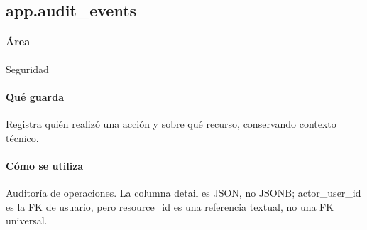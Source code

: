 \subsection{app.audit\_\allowbreak{}events}
\paragraph{Área} Seguridad

\paragraph{Qué guarda} Registra quién realizó una acción y sobre qué recurso, conservando contexto técnico.

\paragraph{Cómo se utiliza} Auditoría de operaciones. La columna detail es JSON, no JSONB; actor\_\allowbreak{}user\_\allowbreak{}id es la FK de usuario, pero resource\_\allowbreak{}id es una referencia textual, no una FK universal.

